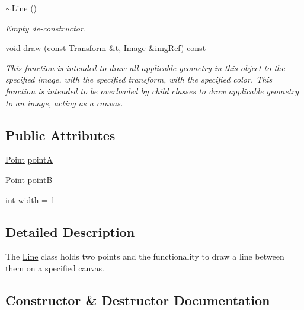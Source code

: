 \begin{DoxyCompactItemize}
\hyperlink{classcturtle_1_1Line_a885276e725f86d89f79b32ee3d885079}{$\sim$\+Line} ()
\begin{DoxyCompactList}\small\item\em Empty de-\/constructor. \end{DoxyCompactList}\item 
void \hyperlink{classcturtle_1_1Line_a25ac5b4024bf9209d324b6f8c16affaf}{draw} (const \hyperlink{classcturtle_1_1Transform}{Transform} \&t, Image \&img\+Ref) const
\begin{DoxyCompactList}\small\item\em This function is intended to draw all applicable geometry in this object to the specified image, with the specified transform, with the specified color. This function is intended to be overloaded by child classes to draw applicable geometry to an image, acting as a canvas. \end{DoxyCompactList}\end{DoxyCompactItemize}
\subsection*{Public Attributes}
\begin{DoxyCompactItemize}
\item 
\hyperlink{structcturtle_1_1ivec2}{Point} \hyperlink{classcturtle_1_1Line_aca3d9298f4dc790552ed6515e2880ed8}{pointA}
\item 
\hyperlink{structcturtle_1_1ivec2}{Point} \hyperlink{classcturtle_1_1Line_a138b108f3a3531c4f7f72a8e26a16fcf}{pointB}
\item 
int \hyperlink{classcturtle_1_1Line_ae0c426af211fc443b7ad2bed4c30050b}{width} = 1
\end{DoxyCompactItemize}


\subsection{Detailed Description}
The \hyperlink{classcturtle_1_1Line}{Line} class holds two points and the functionality to draw a line between them on a specified canvas. 

\subsection{Constructor \& Destructor Documentation}
\mbox{\label{classcturtle_1_1Line_ae08d302308c4b10cc714508b2acca228}} 
